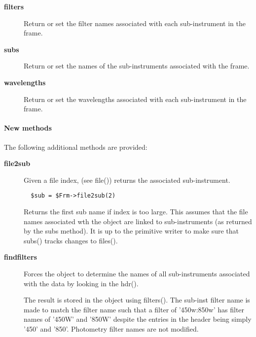 \begin{description}
\begin{description}

\item[{\textbf{filters}}] \mbox{}

Return or set the filter names associated with each sub-instrument
in the frame.


\item[{\textbf{subs}}] \mbox{}

Return or set the names of the sub-instruments associated
with the frame.


\item[{\textbf{wavelengths}}] \mbox{}

Return or set the wavelengths associated with each  sub-instrument
in the frame.

\end{description}
\paragraph*{New methods\label{ORAC::Frame::JCMT_New_methods}}


The following additional methods are provided:

\begin{description}

\item[{\textbf{file2sub}}] \mbox{}

Given a file index, (see file()) returns the associated
sub-instrument.

\begin{verbatim}
  $sub = $Frm->file2sub(2)
\end{verbatim}


Returns the first sub name if index is too large.
This assumes that the file names associated wth the
object are linked to sub-instruments (as returned
by the subs method). It is up to the primitive writer
to make sure that subs() tracks changes to files().


\item[{\textbf{findfilters}}] \mbox{}

Forces the object to determine the names of all sub-instruments
associated with the data by looking in the hdr().



The result is stored in the object using filters(). The sub-inst filter
name is made to match the filter name such that a filter of '450w:850w'
has filter names of '450W' and '850W' despite the entries in the header
being simply '450' and '850'. Photometry filter names are not modified.




\end{description}
\end{description}
